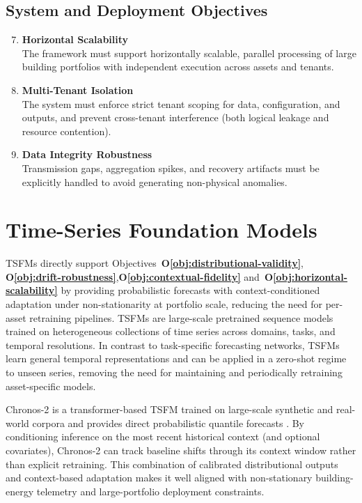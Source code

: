 \subsection{System and Deployment Objectives}
{\renewcommand{\labelenumi}{\textbf{O\arabic{enumi}:}}
\begin{enumerate}
	\setcounter{enumi}{6}
	\item \textbf{Horizontal Scalability}\label{obj:horizontal-scalability}\\
	The framework must support horizontally scalable, parallel processing of large
	building portfolios with independent execution across assets and tenants.

	\item \textbf{Multi-Tenant Isolation}\label{obj:multi-tenant-isolation}\\
	The system must enforce strict tenant scoping for data, configuration, and outputs,
	and prevent cross-tenant interference (both logical leakage and resource contention).

	\item \textbf{Data Integrity Robustness}\label{obj:data-integrity-robustness}\\
	Transmission gaps, aggregation spikes, and recovery artifacts must be explicitly
	handled to avoid generating non-physical anomalies.

\end{enumerate}}

\section{Time-Series Foundation Models}
\label{sec:ts-foundation-models}

\ac{TSFM}s directly support Objectives~\textbf{O\ref{obj:distributional-validity}},
\textbf{O\ref{obj:drift-robustness}},\textbf{O\ref{obj:contextual-fidelity}} and~\textbf{O\ref{obj:horizontal-scalability}} by
providing probabilistic forecasts with context-conditioned adaptation under
non-stationarity at portfolio scale, reducing the need for per-asset retraining
pipelines.
\ac{TSFM}s are large-scale pretrained sequence models trained on heterogeneous
collections of time series across domains, tasks, and temporal resolutions. In contrast
to task-specific forecasting networks, \ac{TSFM}s learn general temporal representations
and can be applied in a zero-shot regime to unseen series, removing the need for
maintaining and periodically retraining asset-specific models.

Chronos-2 is a transformer-based \ac{TSFM} trained on large-scale synthetic and
real-world corpora and provides direct probabilistic quantile forecasts
\parencite{ansari2025chronos}. By conditioning inference on the most recent historical
context (and optional covariates), Chronos-2 can track baseline shifts through its
context window rather than explicit retraining. This combination of calibrated
distributional outputs and context-based adaptation makes it well aligned with
non-stationary building-energy telemetry and large-portfolio deployment constraints.


